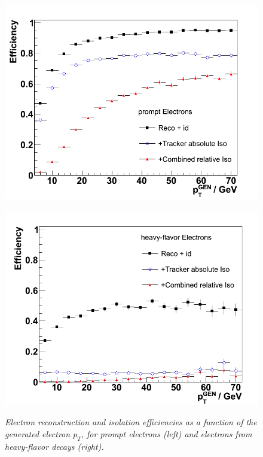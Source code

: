 \begin{figure}[h!]
\begin{minipage}[b]{0.5\linewidth}
\centering
{\label{fig:lm1_cor}\includegraphics[scale=0.32]{./plots/prompt_ele_eff.png}}
\end{minipage}
\begin{minipage}[b]{0.5\linewidth}
\centering
{\label{fig:qcd_cor}\includegraphics[scale=0.32]{./plots/hadron_ele_eff.png}}
\end{minipage}
\caption{\textit{Electron reconstruction and isolation efficiencies as a function of the generated electron $p_{T}$, for prompt electrons (left) and electrons from heavy-flavor decays (right). } }
\label{fig:ele-eff}
\end{figure}

